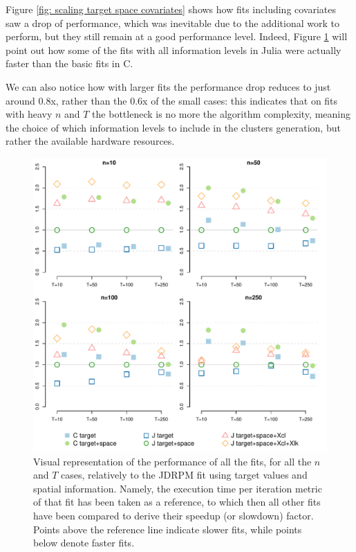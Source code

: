 \documentclass[12pt,	%
	a4paper,		%
	twoside,		%
	openright,		%
	titlepage,%
	]{book}
\theoremstyle{definition}
\begin{document}
Figure \ref{fig: scaling target space covariates} shows how fits including covariates saw a drop of performance, which was inevitable due to the additional work to perform, but they still remain at a good performance level. Indeed, Figure \ref{fig: summary performance scaling} will point out how some of the fits with all information levels in Julia were actually faster than the basic fits in C.

We can also notice how with larger fits the performance drop reduces to just around 0.8x, rather than the 0.6x of the small cases: this indicates that on fits with heavy $n$ and $T$ the bottleneck is no more the algorithm complexity, meaning the choice of which information levels to include in the clusters generation, but rather the available hardware resources.



\begin{figure}[!ht]
    \centering
    \includegraphics[width=1\linewidth]{Testing/Scaling possibilities/summary_performance_higher.pdf}
    \caption[Visual representation of all fitting performances]{Visual representation of the performance of all the fits, for all the $n$ and $T$ cases, relatively to the JDRPM fit using target values and spatial information. Namely, the execution time per iteration metric of that fit has been taken as a reference, to which then all other fits have been compared to derive their speedup (or slowdown) factor. Points above the reference line indicate slower fits, while points below denote faster fits.}
    \label{fig: summary performance scaling}
\end{figure} 
\end{document}
